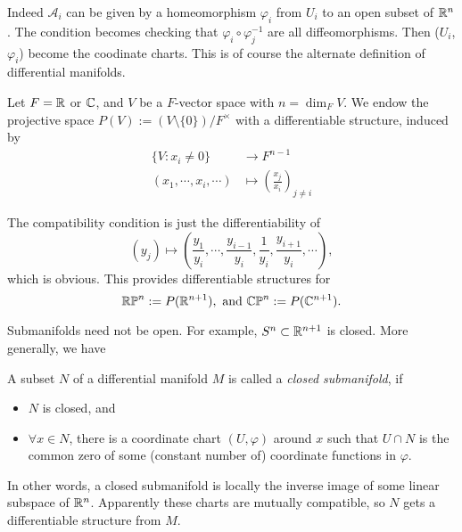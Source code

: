 Indeed $\mathcal{A}_i$ can be given by a homeomorphism $\varphi_i$ from $U_i$ to an open subset of $\mathbb{R}^n$. The condition becomes checking that  $\varphi_i\circ\varphi_j^{-1}$ are all diffeomorphisms. Then ($U_i$,$\varphi_i$) become the coodinate charts. This is of course the alternate definition of differential manifolds.

\begin{example}\label{eg.projspace}
    Let $F=\mathbb{R}$ or $\mathbb{C}$, and $V$ be a $F$-vector space with $n=\dim_FV$. We endow the projective space $P(V):=(V\setminus\{0\})/F^\times$ with a differentiable structure, induced by
    \begin{align*}
        \{V:x_i\neq0\} & \longrightarrow F^{n-1} \\
        (x_1,\cdots,x_i,\cdots) & \mapsto \left(\frac{x_j}{x_i}\right)_{j\neq i}
    \end{align*}

    The compatibility condition is just the differentiability of 
    $$(y_j)\mapsto\left(\frac{y_1}{y_i},\cdots,\frac{y_{i-1}}{y_i},\frac{1}{y_i},\frac{y_{i+1}}{y_i},\cdots\right),$$
    which is obvious. This provides differentiable structures for
    $$\mathbb{RP}^n:=P(\mathbb{R}^{n+1}),\text{ and }\mathbb{CP}^n:=P(\mathbb{C}^{n+1}).$$
\end{example}

Submanifolds need not be open. For example, $S^n\subset\mathbb{R}^{n+1}$ is closed. More generally, we have

\begin{definition}
    A subset $N$ of a differential manifold $M$ is called a \emph{closed submanifold}, if
    \begin{itemize}
        \item $N$ is closed, and
        \item $\forall x\in N$, there is a coordinate chart $(U,\varphi)$ around $x$ such that $U\cap N$ is the common zero of some (constant number of) coordinate functions in $\varphi$.
    \end{itemize}

    In other words, a closed submanifold is locally the inverse image of some linear subspace of $\mathbb{R}^n$. Apparently these charts are mutually compatible, so $N$ gets a differentiable structure from $M$.
\end{definition}

